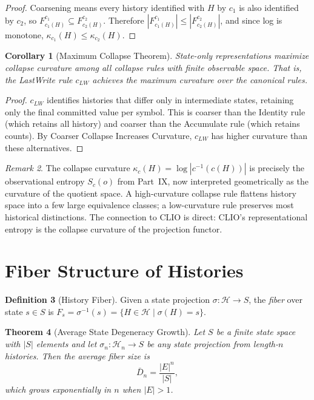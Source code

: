 \documentclass[12pt, a4paper, openany]{book}
\theoremstyle{plain}
\newtheorem{theorem}{Theorem}[chapter]
\newtheorem{corollary}[theorem]{Corollary}
\theoremstyle{definition}
\newtheorem{definition}[theorem]{Definition}
\theoremstyle{remark}
\newtheorem{remark}[theorem]{Remark}
\newcommand{\calH}{\mathcal{H}}
\begin{document}
\begin{proof}
Coarsening means every history identified with $H$ by $c_1$ is also identified
by $c_2$, so $F^{c_1}_{c_1(H)} \subseteq F^{c_2}_{c_2(H)}$. Therefore
$|F^{c_1}_{c_1(H)}| \leq |F^{c_2}_{c_2(H)}|$, and since log is monotone,
$\kappa_{c_1}(H) \leq \kappa_{c_2}(H)$.
\end{proof}

\begin{corollary}[Maximum Collapse Theorem]
State-only representations maximize collapse curvature among all collapse rules
with finite observable space. That is, the LastWrite rule $c_{LW}$ achieves
the maximum curvature over the canonical rules.
\end{corollary}

\begin{proof}
$c_{LW}$ identifies histories that differ only in intermediate states, retaining
only the final committed value per symbol. This is coarser than the Identity rule
(which retains all history) and coarser than the Accumulate rule (which retains
counts). By Coarser Collapse Increases Curvature, $c_{LW}$ has higher curvature
than these alternatives.
\end{proof}

\begin{remark}
The collapse curvature $\kappa_c(H) = \log|c^{-1}(c(H))|$ is precisely the
observational entropy $S_c(o)$ from Part~IX, now interpreted geometrically as
the curvature of the quotient space. A high-curvature collapse rule flattens
history space into a few large equivalence classes; a low-curvature rule
preserves most historical distinctions. The connection to CLIO is direct:
CLIO's representational entropy is the collapse curvature of the projection
functor.
\end{remark}

\section{Fiber Structure of Histories}

\begin{definition}[History Fiber]
Given a state projection $\sigma : \calH \to S$, the \emph{fiber} over state
$s \in S$ is $F_s = \sigma^{-1}(s) = \{H \in \calH \mid \sigma(H) = s\}$.
\end{definition}

\begin{theorem}[Average State Degeneracy Growth]
Let $S$ be a finite state space with $|S|$ elements and let
$\sigma_n : \calH_n \to S$ be any state projection from length-$n$ histories.
Then the average fiber size is
\[
\bar{D}_n = \frac{|E|^n}{|S|},
\]
which grows exponentially in $n$ when $|E| > 1$.
\end{theorem}
\end{document}

